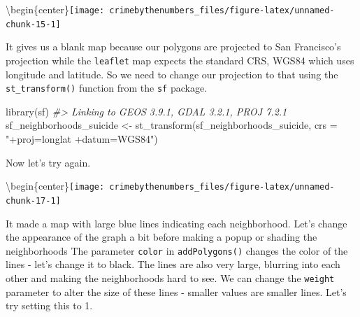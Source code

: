 \documentclass[
]{krantz}
\makeatletter
\newenvironment{Shaded}{\begin{snugshade}}{\end{snugshade}}
\newcommand{\AttributeTok}[1]{\textcolor[rgb]{0.61,0.61,0.61}{#1}}
\newcommand{\CommentTok}[1]{\textcolor[rgb]{0.37,0.37,0.37}{\textit{#1}}}
\newcommand{\FunctionTok}[1]{\textcolor[rgb]{0,0,0}{#1}}
\newcommand{\NormalTok}[1]{#1}
\newcommand{\OtherTok}[1]{\textcolor[rgb]{0.37,0.37,0.37}{#1}}
\newcommand{\SpecialCharTok}[1]{\textcolor[rgb]{0,0,0}{#1}}
\newcommand{\StringTok}[1]{\textcolor[rgb]{0.5,0.5,0.5}{#1}}
\newenvironment{kframe}{%
\medskip{}
\setlength{\fboxsep}{.8em}
 \def\at@end@of@kframe{}%
 \ifinner\ifhmode%
  \def\at@end@of@kframe{\end{minipage}}%
  \begin{minipage}{\columnwidth}%
 \fi\fi%
 \def\FrameCommand##1{\hskip\@totalleftmargin \hskip-\fboxsep
 \colorbox{shadecolor}{##1}\hskip-\fboxsep
     \hskip-\linewidth \hskip-\@totalleftmargin \hskip\columnwidth}%
 \MakeFramed {\advance\hsize-\width
   \@totalleftmargin\z@ \linewidth\hsize
   \@setminipage}}%
 {\par\unskip\endMakeFramed%
 \at@end@of@kframe}
\renewenvironment{Shaded}{\begin{kframe}}{\end{kframe}}
\makeatother
\begin{document}
\textbackslash begin\{center\}\texttt{[image: crimebythenumbers\_files/figure-latex/unnamed-chunk-15-1]}

It gives us a blank map because our polygons are projected to San Francisco's projection while the \texttt{leaflet} map expects the standard CRS, WGS84 which uses longitude and latitude. So we need to change our projection to that using the \texttt{st\_transform()} function from the \texttt{sf} package.

\begin{Shaded}
\begin{Highlighting}[]
\FunctionTok{library}\NormalTok{(sf)}
\CommentTok{\#\textgreater{} Linking to GEOS 3.9.1, GDAL 3.2.1, PROJ 7.2.1}
\NormalTok{sf\_neighborhoods\_suicide }\OtherTok{\textless{}{-}} \FunctionTok{st\_transform}\NormalTok{(sf\_neighborhoods\_suicide,}
                                         \AttributeTok{crs =} \StringTok{"+proj=longlat +datum=WGS84"}\NormalTok{)}
\end{Highlighting}
\end{Shaded}

Now let's try again.

\begin{Shaded}
\end{Shaded}

\textbackslash begin\{center\}\texttt{[image: crimebythenumbers\_files/figure-latex/unnamed-chunk-17-1]}

It made a map with large blue lines indicating each neighborhood. Let's change the appearance of the graph a bit before making a popup or shading the neighborhoods The parameter \texttt{color} in \texttt{addPolygons()} changes the color of the lines - let's change it to black. The lines are also very large, blurring into each other and making the neighborhoods hard to see. We can change the \texttt{weight} parameter to alter the size of these lines - smaller values are smaller lines. Let's try setting this to 1.
\end{document}
